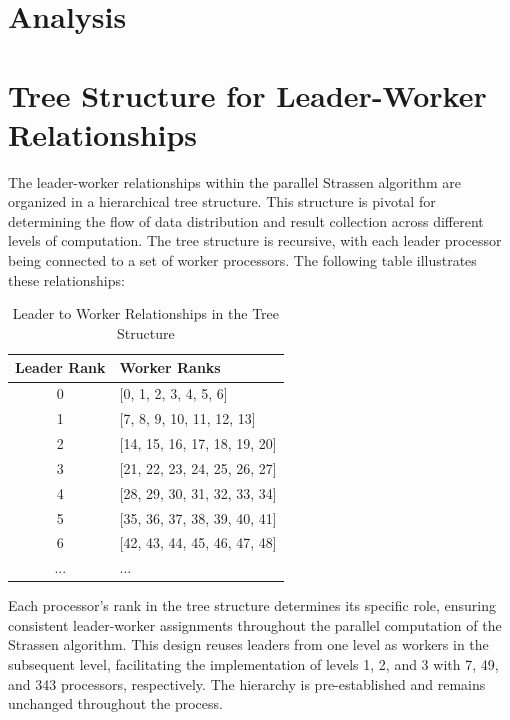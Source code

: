 \documentclass[12pt,a4paper]{article}
\begin{document}
\section{Analysis}


\appendix
\clearpage
\section{Tree Structure for Leader-Worker Relationships}
\label{appendix:tree_structure}

The leader-worker relationships within the parallel Strassen algorithm are organized in a hierarchical tree structure. This structure is pivotal for determining the flow of data distribution and result collection across different levels of computation. The tree structure is recursive, with each leader processor being connected to a set of worker processors. The following table illustrates these relationships:

\begin{table}[htbp]
    \centering
    \begin{tabular}{cl}
        \toprule
        \textbf{Leader Rank} & \textbf{Worker Ranks} \\
        \midrule
        0 & [0, 1, 2, 3, 4, 5, 6] \\
        1 & [7, 8, 9, 10, 11, 12, 13] \\
        2 & [14, 15, 16, 17, 18, 19, 20] \\
        3 & [21, 22, 23, 24, 25, 26, 27] \\
        4 & [28, 29, 30, 31, 32, 33, 34] \\
        5 & [35, 36, 37, 38, 39, 40, 41] \\
        6 & [42, 43, 44, 45, 46, 47, 48] \\
        ... & ... \\
        \bottomrule
    \end{tabular}
    \caption{Leader to Worker Relationships in the Tree Structure}
    \label{tab:leader_worker_relationships}
\end{table}

Each processor's rank in the tree structure determines its specific role, ensuring consistent leader-worker assignments throughout the parallel computation of the Strassen algorithm. This design reuses leaders from one level as workers in the subsequent level, facilitating the implementation of levels 1, 2, and 3 with 7, 49, and 343 processors, respectively. The hierarchy is pre-established and remains unchanged throughout the process.
\end{document}
